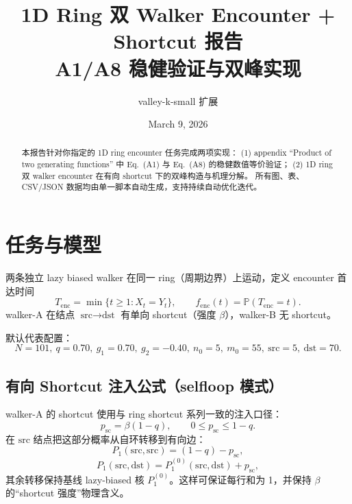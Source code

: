 \documentclass[11pt]{article}
\title{1D Ring 双 Walker Encounter + Shortcut 报告\\\large A1/A8 稳健验证与双峰实现}
\author{valley-k-small 扩展}
\date{March 9, 2026}
\begin{document}
\maketitle

\begin{abstract}
本报告针对你指定的 1D ring encounter 任务完成两项实现：
(1) appendix ``Product of two generating functions'' 中 Eq.~(A1) 与 Eq.~(A8) 的稳健数值等价验证；
(2) 1D ring 双 walker encounter 在有向 shortcut 下的双峰构造与机理分解。
所有图、表、CSV/JSON 数据均由单一脚本自动生成，支持持续自动优化迭代。
\end{abstract}

\section{任务与模型}
两条独立 lazy biased walker 在同一 ring（周期边界）上运动，定义 encounter 首达时间
\[
T_{\mathrm{enc}}=\min\{t\ge1:X_t=Y_t\},\qquad
f_{\mathrm{enc}}(t)=\mathbb P(T_{\mathrm{enc}}=t).
\]
walker-A 在结点 $\text{src}\to\text{dst}$ 有单向 shortcut（强度 $\beta$），walker-B 无 shortcut。

默认代表配置：
\[
N=101,\ q=0.70,\ g_1=0.70,\ g_2=-0.40,\ n_0=5,\ m_0=55,\ \text{src}=5,\ \text{dst}=70.
\]

\subsection*{有向 Shortcut 注入公式（selfloop 模式）}
walker-A 的 shortcut 使用与 ring shortcut 系列一致的注入口径：
\[
p_{\mathrm{sc}}=\beta(1-q),\qquad 0\le p_{\mathrm{sc}}\le 1-q.
\]
在 $\mathrm{src}$ 结点把这部分概率从自环转移到有向边：
\[
P_1(\mathrm{src},\mathrm{src})=(1-q)-p_{\mathrm{sc}},
\]
\[
P_1(\mathrm{src},\mathrm{dst})=P_1^{(0)}(\mathrm{src},\mathrm{dst})+p_{\mathrm{sc}},
\]
其余转移保持基线 lazy-biased 核 $P_1^{(0)}$。这样可保证每行和为 1，并保持 $\beta$ 的“shortcut 强度”物理含义。
\end{document}
